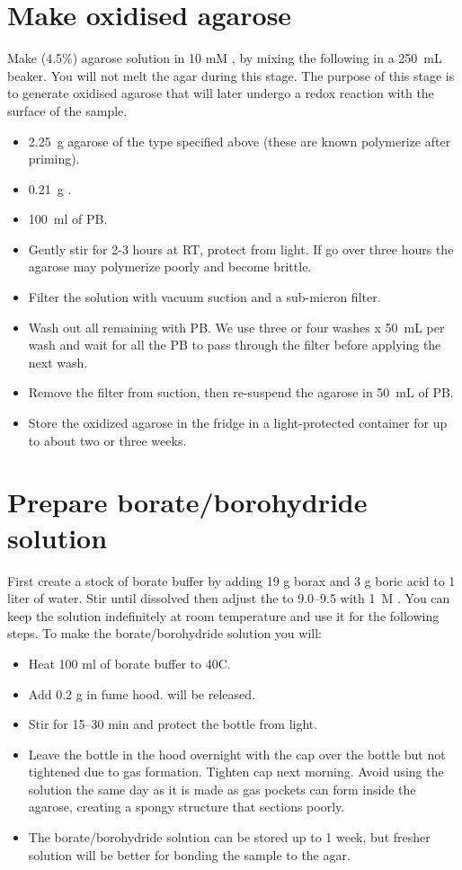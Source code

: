\documentclass[paper=a4, fontsize=11pt]{scrartcl} %
\numberwithin{equation}{section} %
\numberwithin{figure}{section} %
\numberwithin{table}{section} %
\begin{document}
\section{Make oxidised agarose}
Make (4.5\%) agarose solution in 10 mM , by mixing the following in a 250~mL beaker. You 
will not melt the agar during this stage. The purpose of this stage is to generate oxidised agarose
that will later undergo a redox reaction with the surface of the sample.
\begin{itemize}
\item 2.25~g agarose of the type specified above (these are known polymerize after priming). 
\item 0.21~g .
\item 100~ml of PB. 
\item Gently stir for 2-3 hours at RT, protect from light.
If go over three hours the agarose may polymerize poorly and become brittle.
\item Filter the solution with vacuum suction and a sub-micron filter.
\item Wash out all remaining  with PB. 
We use three or four washes x 50~mL per wash and wait for all the PB to pass through the filter before applying the next wash.
\item Remove the filter from suction, then re-suspend  the agarose in 50~mL of PB.
\item Store the oxidized agarose in the fridge in a light-protected container for up to about two or three weeks.
\end{itemize}

 

\section{Prepare borate/borohydride solution}
First create a stock of borate buffer by adding 19 g borax and 3 g boric acid to 1 liter of water. 
Stir until dissolved then adjust the \pH to 9.0--9.5 with 1~M .
You can keep the solution indefinitely at room temperature and use it for the following steps.
To make the borate/borohydride solution you will:
\begin{itemize}
\item Heat 100 ml of borate buffer to 40\degree C.
\item Add 0.2 g  in fume hood.  will be released.
\item Stir for 15--30 min and protect the bottle from light.
\item Leave the bottle in the hood overnight with the cap over the bottle but not tightened due to gas formation.
Tighten cap next morning. 
Avoid using the solution the same day as it is made as gas pockets can form inside the agarose, creating a spongy structure that sections poorly.
\item The borate/borohydride solution can be stored up to 1 week, but fresher solution will be better for bonding the sample to the agar.
\end{itemize}
\end{document}
